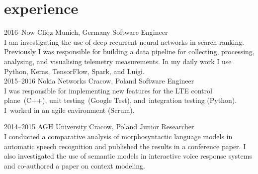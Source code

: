 \documentclass[]{friggeri-cv_osx} %
\begin{document}

\section{experience}
\begin{entrylist}

\entry
{2016--Now}
{Cliqz}
{Munich, Germany}
{Software Engineer \\
  I am investigating the use of deep recurrent neural networks in search ranking. Previously I was responsible for building a data pipeline for collecting, processing, analysing, and visualising telemetry measurements. In my daily work I use Python, Keras, TensorFlow, Spark, and Luigi. \\}  
\entry
{2015--2016}
{Nokia Networks}
{Cracow, Poland}
{Software Engineer \\
  I was responsible for implementing new features for the LTE control plane~(C++), unit testing~(Google Test), and~integration testing (Python). I~worked in an agile environment (Scrum).\\}

\entry
{2014--2015}
{AGH University}
{Cracow, Poland}
{Junior Researcher \\
  I conducted a comparative analysis of morphosyntactic language models in automatic speech recognition and published the results in a conference paper. I also investigated the use of semantic models in interactive voice response systems and co-authored a paper on context modeling.\\}

\end{entrylist}


%
%
\end{document}
